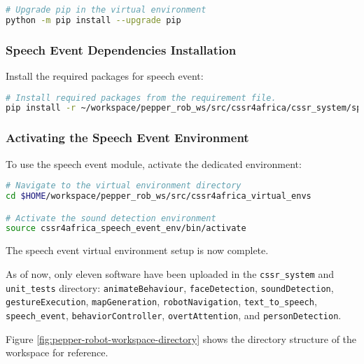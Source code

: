 \documentclass{CSSRforAfrica}
\begin{document}
{\begin{lstlisting}[style=withoutNumbering, language=bash]
# Upgrade pip in the virtual environment
python -m pip install --upgrade pip
\end{lstlisting}

\subsubsection*{Speech Event Dependencies Installation}
Install the required packages for speech event:
\begin{lstlisting}[style=withoutNumbering, language=bash]
# Install required packages from the requirement file.
pip install -r ~/workspace/pepper_rob_ws/src/cssr4africa/cssr_system/speech_event/speech_event_requirements.txt
\end{lstlisting}

\subsubsection*{Activating the Speech Event Environment}
To use the speech event module, activate the dedicated environment:
\begin{lstlisting}[style=withoutNumbering, language=bash]
# Navigate to the virtual environment directory
cd $HOME/workspace/pepper_rob_ws/src/cssr4africa_virtual_envs

# Activate the sound detection environment
source cssr4africa_speech_event_env/bin/activate
\end{lstlisting}

The speech event virtual environment setup is now complete.

\newpage

As of now, only eleven software have been uploaded in the \texttt{cssr\_system} and \texttt{unit\_tests} directory: \texttt{animateBehaviour}, \texttt{faceDetection}, \texttt{soundDetection}, \texttt{gestureExecution}, \texttt{mapGeneration}, \texttt{robotNavigation}, \texttt{text\_to\_speech}, \texttt{speech\_event}, \texttt{behaviorController}, \texttt{overtAttention}, $ $and \texttt{personDetection}.

Figure \ref{fig:pepper-robot-workspace-directory} shows the directory structure of the workspace for reference.
\begin{figure}[ht]

{\small 
{}
}


\end{figure}}
\end{document}
